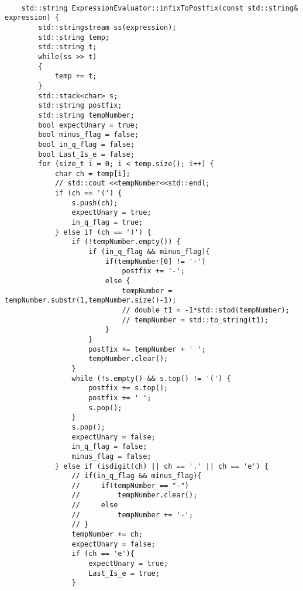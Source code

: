 \documentclass[UTF8]{ctexart}
\begin{document}
\begin{lstlisting}
    
    std::string ExpressionEvaluator::infixToPostfix(const std::string& expression) {
        std::stringstream ss(expression);
        std::string temp;
        std::string t;
        while(ss >> t)
        {
            temp += t;
        }
        std::stack<char> s;
        std::string postfix;
        std::string tempNumber;
        bool expectUnary = true;
        bool minus_flag = false;
        bool in_q_flag = false;
        bool Last_Is_e = false;
        for (size_t i = 0; i < temp.size(); i++) {
            char ch = temp[i];
            // std::cout <<tempNumber<<std::endl;
            if (ch == '(') {
                s.push(ch);
                expectUnary = true;
                in_q_flag = true;
            } else if (ch == ')') {
                if (!tempNumber.empty()) {
                    if (in_q_flag && minus_flag){
                        if(tempNumber[0] != '-')
                            postfix += '-';
                        else {
                            tempNumber = tempNumber.substr(1,tempNumber.size()-1);
                            // double t1 = -1*std::stod(tempNumber);
                            // tempNumber = std::to_string(t1);
                        }
                    }
                    postfix += tempNumber + ' ';
                    tempNumber.clear();
                }
                while (!s.empty() && s.top() != '(') {
                    postfix += s.top();
                    postfix += ' ';
                    s.pop();
                }
                s.pop();
                expectUnary = false;
                in_q_flag = false;
                minus_flag = false;
            } else if (isdigit(ch) || ch == '.' || ch == 'e') {
                // if(in_q_flag && minus_flag){
                //     if(tempNumber == "-")
                //         tempNumber.clear();
                //     else
                //         tempNumber += '-';
                // }
                tempNumber += ch;
                expectUnary = false;
                if (ch == 'e'){
                    expectUnary = true;
                    Last_Is_e = true;
                }
                

\end{lstlisting}
\end{document}
